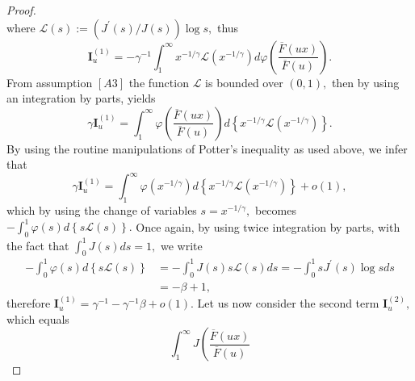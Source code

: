 \documentclass[12pt,reqno,openbib,runningheads,a4paper,portrait]{amsart}%
\begin{document}
\begin{proof}
\[\]
where $\mathcal{L}\left(  s\right)  :=\left(  J^{\prime}\left(  s\right)
/J\left(  s\right)  \right)  \log s,$ thus%
\[
\mathbf{I}_{u}^{\left(  1\right)  }=-\gamma^{-1}%
{\displaystyle\int_{1}^{\infty}}
x^{-1/\gamma}\mathcal{L}\left(  x^{-1/\gamma}\right)  d\varphi\left(
\frac{\overline{F}\left(  ux\right)  }{\overline{F}\left(  u\right)  }\right)
.
\]
From assumption $\left[  A3\right]  $ the function $\mathcal{L}$ is bounded
over $\left(  0,1\right)  ,$ then by using an integration by parts, yields%
\[
\gamma\mathbf{I}_{u}^{\left(  1\right)  }=%
{\displaystyle\int_{1}^{\infty}}
\varphi\left(  \frac{\overline{F}\left(  ux\right)  }{\overline{F}\left(
u\right)  }\right)  d\left\{  x^{-1/\gamma}\mathcal{L}\left(  x^{-1/\gamma
}\right)  \right\}  .
\]
By using the routine manipulations of Potter's inequality as used above, we
infer that%
\[
\gamma\mathbf{I}_{u}^{\left(  1\right)  }=%
{\displaystyle\int_{1}^{\infty}}
\varphi\left(  x^{-1/\gamma}\right)  d\left\{  x^{-1/\gamma}\mathcal{L}\left(
x^{-1/\gamma}\right)  \right\}  +o\left(  1\right)  ,
\]
which by using the change of variables $s=x^{-1/\gamma},$ becomes $-%
{\displaystyle\int_{0}^{1}}
\varphi\left(  s\right)  d\left\{  s\mathcal{L}\left(  s\right)  \right\}  .$
Once again, by using twice integration by parts, with the fact that $%
{\displaystyle\int_{0}^{1}}
J\left(  s\right)  ds=1,$ we write
\begin{align*}
-%
{\displaystyle\int_{0}^{1}}
\varphi\left(  s\right)  d\left\{  s\mathcal{L}\left(  s\right)  \right\}   &
=-%
{\displaystyle\int_{0}^{1}}
J\left(  s\right)  s\mathcal{L}\left(  s\right)  ds=-%
{\displaystyle\int_{0}^{1}}
sJ^{\prime}\left(  s\right)  \log sds\\
&  =-\beta+1,
\end{align*}
therefore $\mathbf{I}_{u}^{\left(  1\right)  }=\gamma^{-1}-\gamma^{-1}%
\beta+o\left(  1\right)  .$ Let us now consider the second term $\mathbf{I}%
_{u}^{\left(  2\right)  },$ which equals%
\[%
{\displaystyle\int_{1}^{\infty}}
J\left(  \frac{\overline{F}\left(  ux\right)  }{\overline{F}\left(  u\right)
}\]
\end{proof}
\end{document}
